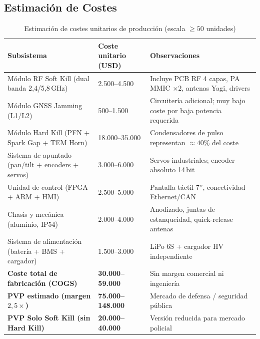 \documentclass[12pt,a4paper]{article}
\begin{document}
\subsection{Estimación de Costes}

\begin{table}[H]
\centering
\caption{Estimación de costes unitarios de producción (escala $\geq 50$ unidades)}
\label{tab:costes}
\renewcommand{\arraystretch}{1.3}
\begin{tabularx}{\textwidth}{lXX}
\toprule
\textbf{Subsistema} &
\textbf{Coste unitario (USD)} &
\textbf{Observaciones} \\
\midrule
Módulo RF Soft Kill (dual banda 2,4/5,8\,GHz) &
  2.500–4.500 &
  Incluye PCB RF 4 capas, PA MMIC $\times 2$, antenas Yagi, drivers \\[3pt]

Módulo GNSS Jamming (L1/L2) &
  500–1.500 &
  Circuitería adicional; muy bajo coste por baja potencia requerida \\[3pt]

Módulo Hard Kill (PFN + Spark Gap + TEM Horn) &
  18.000–35.000 &
  Condensadores de pulso representan $\approx 40\%$ del coste \\[3pt]

Sistema de apuntado (pan/tilt + encoders + servos) &
  3.000–6.000 &
  Servos industriales; encoder absoluto 14\,bit \\[3pt]

Unidad de control (FPGA + ARM + HMI) &
  2.500–5.000 &
  Pantalla táctil 7'', conectividad Ethernet/CAN \\[3pt]

Chasis y mecánica (aluminio, IP54) &
  2.000–4.000 &
  Anodizado, juntas de estanqueidad, quick-release antenas \\[3pt]

Sistema de alimentación (batería + BMS + cargador) &
  1.500–3.000 &
  LiPo 6S + cargador HV independiente \\[3pt]

\midrule
\textbf{Coste total de fabricación (COGS)} &
  \textbf{30.000–59.000} &
  Sin margen comercial ni ingeniería \\[2pt]

\textbf{PVP estimado (margen $2{,}5\times$)} &
  \textbf{75.000–148.000} &
  Mercado de defensa / seguridad pública \\[2pt]

\textbf{PVP Solo Soft Kill (sin Hard Kill)} &
  \textbf{20.000–40.000} &
  Versión reducida para mercado policial \\
\bottomrule
\end{tabularx}
\end{table}
\end{document}
